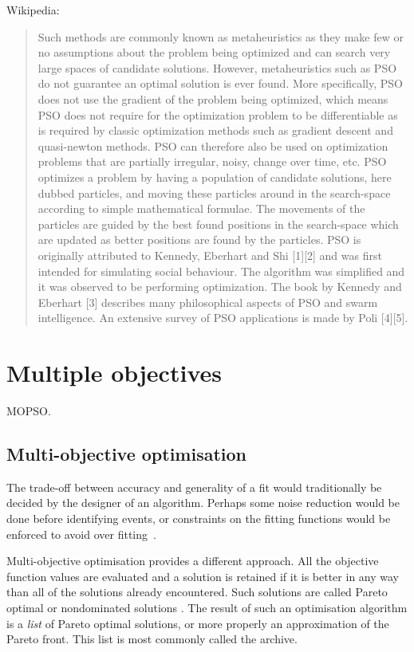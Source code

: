 Wikipedia: 
\begin{quote}
  Such methods are commonly known as metaheuristics as they make few
  or no assumptions about the problem being optimized and can search
  very large spaces of candidate solutions. However, metaheuristics
  such as PSO do not guarantee an optimal solution is ever found.
  More specifically, PSO does not use the gradient of the problem
  being optimized, which means PSO does not require for the
  optimization problem to be differentiable as is required by classic
  optimization methods such as gradient descent and quasi-newton
  methods. PSO can therefore also be used on optimization problems
  that are partially irregular, noisy, change over time, etc.  PSO
  optimizes a problem by having a population of candidate solutions,
  here dubbed particles, and moving these particles around in the
  search-space according to simple mathematical formulae. The
  movements of the particles are guided by the best found positions in
  the search-space which are updated as better positions are found by
  the particles.  PSO is originally attributed to Kennedy, Eberhart
  and Shi [1][2] and was first intended for simulating social
  behaviour. The algorithm was simplified and it was observed to be
  performing optimization. The book by Kennedy and Eberhart [3]
  describes many philosophical aspects of PSO and swarm
  intelligence. An extensive survey of PSO applications is made by
  Poli [4][5].
\end{quote}

\section{Multiple objectives}
MOPSO.

\subsection{Multi-objective optimisation}
The trade-off between accuracy and generality of a fit would
traditionally be decided by the designer of an algorithm.  Perhaps
some noise reduction would be done before identifying events, or
constraints on the fitting functions would be enforced to avoid over
fitting~\cite{Arora2003Fitting,Punskaya2002Bayesian}.  

Multi-objective optimisation provides a different approach.  All the
objective function values are evaluated and a solution is retained if
it is better in any way than all of the solutions already encountered.
Such solutions are called Pareto optimal or nondominated
solutions \cite{Steuer1986Multiple}. The result of such an optimisation
algorithm is a \emph{list} of Pareto optimal solutions, or more
properly an approximation of the Pareto front.  This list is most
commonly called the archive.

